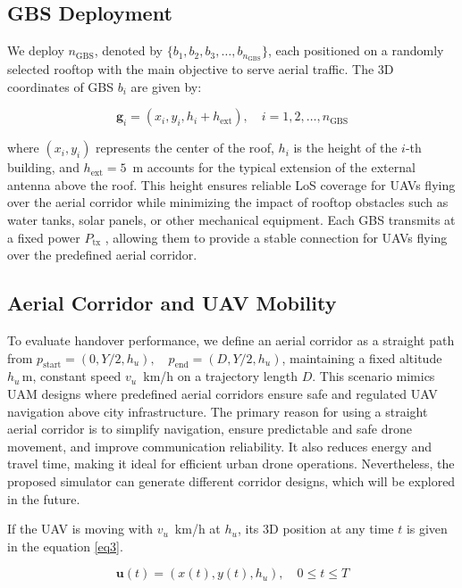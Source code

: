 \documentclass[conference]{IEEEtran}
\begin{document}
\subsection{GBS Deployment}

We deploy $n_{\text{GBS}}$, denoted by $\{b_1, b_2, b_3, \dots, b_{n_{\text{GBS}}}\}$, each positioned on a randomly selected rooftop with the main objective to serve aerial traffic. The 3D coordinates of GBS $b_i$ are given by:

\begin{equation}
\mathbf{g}_i = (x_i, y_i, h_i + h_{\text{ext}}), \quad i = 1, 2, \dots, n_{\text{GBS}}
\end{equation}

where $(x_i, y_i)$ represents the center of the roof, $h_i$ is the height of the $i$-th building, and $h_{\text{ext}} = 5$~m accounts for the typical extension of the external antenna above the roof. This height ensures reliable LoS coverage for UAVs flying over the aerial corridor while minimizing the impact of rooftop obstacles such as water tanks, solar panels, or other mechanical equipment. Each GBS transmits at a fixed power $P_{\mathrm{tx}}$%
, allowing them to provide a stable connection for UAVs flying over the predefined aerial corridor.

\subsection{Aerial Corridor and UAV Mobility}

To evaluate handover performance, we define an aerial corridor as a straight path from $p_{\text{start}} = (0, Y/2, h_u), \quad p_{\text{end}} = (D, Y/2, h_u)$,
maintaining a fixed altitude $h_u\,$m, constant speed $v_u$~km/h on a trajectory length $D$. This scenario mimics UAM designs where predefined aerial corridors ensure safe and regulated UAV navigation above city infrastructure. The primary reason for using a straight aerial corridor is to simplify navigation, ensure predictable and safe drone movement, and improve communication reliability. It also reduces energy and travel time, making it ideal for efficient urban drone operations. Nevertheless, the proposed simulator can generate different corridor designs, which will be explored in the future.  

If the UAV is moving with $v_u$~km/h at $h_u$, its 3D position at any time $t$ is given in the equation \eqref{eq3}. 

\begin{equation}
\label{eq3} 
\mathbf{u}(t) = (x(t), y(t), h_u), \quad 0 \le t \le T
\end{equation}
\end{document}
